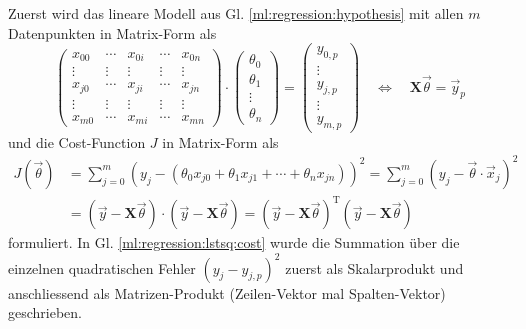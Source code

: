 Zuerst wird das lineare Modell aus Gl. \eqref{ml:regression:hypothesis} mit allen
$m$ Datenpunkten in Matrix-Form als
\begin{equation}
    \begin{pmatrix}
        x_{00}& \cdots& x_{0i}& \cdots& x_{0n}\\
        \vdots& \vdots& \vdots& \vdots& \vdots\\
        x_{j0}& \cdots& x_{ji}& \cdots& x_{jn}\\
        \vdots& \vdots& \vdots& \vdots& \vdots\\
        x_{m0}& \cdots& x_{mi}& \cdots& x_{mn}
    \end{pmatrix}
    \cdot
    \begin{pmatrix}
        \theta_0\\ \theta_1 \\ \vdots\\ \theta_n
    \end{pmatrix}
    = \begin{pmatrix}
        y_{0,p}\\ \vdots \\ y_{j,p} \\ \vdots \\ y_{m,p}
    \end{pmatrix}
    \quad \iff \quad
    \mathbf{X} \vec \theta = \vec y_p
    \label{ml:regression:lstsq:modell}
\end{equation}
und die Cost-Function $J$ in Matrix-Form als
\begin{align}
    J(\vec \theta) &= \sum_{j=0}^m \left(y_j - (\theta_0 x_{j0} + \theta_1 x_{j1} + \cdots + \theta_n x_{jn}) \right)^2
    = \sum_{j=0}^{m} \left( y_j - \vec \theta \cdot \vec x_j \right)^2 \nonumber\\
    &= \left(\vec y - \mathbf{X} \vec \theta\right) \cdot \left(\vec y - \mathbf{X} \vec \theta\right)
    = \left(\vec y - \mathbf{X} \vec \theta\right)^\mathrm{T} \left(\vec y - \mathbf{X} \vec \theta\right)
    \label{ml:regression:lstsq:cost}
\end{align}
formuliert. In Gl. \eqref{ml:regression:lstsq:cost} wurde die Summation über die
einzelnen quadratischen Fehler $(y_j - y_{j,p})^2$ zuerst als Skalarprodukt und
anschliessend als Matrizen-Produkt (Zeilen-Vektor mal Spalten-Vektor) geschrieben.

